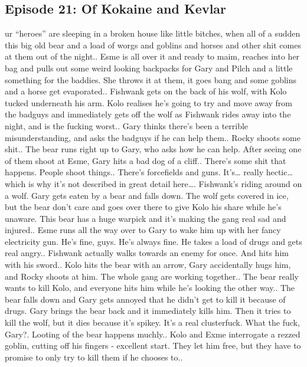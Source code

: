 \subsection{Episode 21: Of Kokaine and Kevlar}
ur “heroes” are sleeping in a broken house like little bitches, when all of a sudden this big old bear and a load of worgs and goblins and horses and other shit comes at them out of the night..\medskip
Esme is all over it and ready to maim, reaches into her bag and pulls out some weird looking backpacks for Gary and Pilch and a little something for the baddies. She throws it at them, it goes bang and some goblins and a horse get evaporated..\medskip
Fishwank gets on the back of his wolf, with Kolo tucked underneath his arm. Kolo realises he’s going to try and move away from the badguys and immediately gets off the wolf as Fishwank rides away into the night, and is the fucking worst..\medskip
Gary thinks there’s been a terrible misunderstanding, and asks the badguys if he can help them..\medskip
Rocky shoots some shit..\medskip
The bear runs right up to Gary, who asks how he can help. After seeing one of them shoot at Esme, Gary hits a bad dog of a cliff..\medskip
There’s some shit that happens. People shoot things..\medskip
There’s forcefields and guns. It’s… really hectic… which is why it’s not described in great detail here….\medskip
Fishwank’s riding around on a wolf. Gary gets eaten by a bear and falls down. The wolf gets covered in ice, but the bear don’t care and goes over there to give Kolo his share while he’s unaware. This bear has a huge warpick and it’s making the gang real sad and injured..\medskip
Esme runs all the way over to Gary to wake him up with her fancy electricity gun. He’s fine, guys. He’s always fine. He takes a load of drugs and gets real angry..\medskip
Fishwank actually walks towards an enemy for once. And hits him with his sword..\medskip
Kolo hits the bear with an arrow, Gary accidentally hugs him, and Rocky shoots at him. The whole gang are working together..\medskip
The bear really wants to kill Kolo, and everyone hits him while he’s looking the other way..\medskip
The bear falls down and Gary gets annoyed that he didn’t get to kill it because of drugs. Gary brings the bear back and it immediately kills him. Then it tries to kill the wolf, but it dies because it’s spikey. It’s a real clusterfuck. What the fuck, Gary?.\medskip
Looting of the bear happens muchly..\medskip
Kolo and Exme interrogate a rezzed goblin, cutting off his fingers - excellent start. They let him free, but they have to promise to only try to kill them if he chooses to..\medskip
